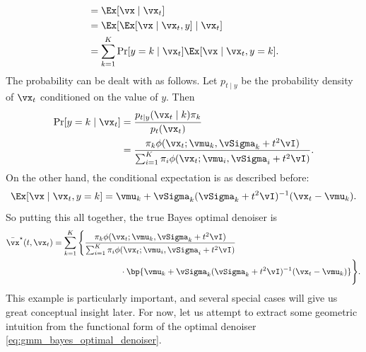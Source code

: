 \documentclass[../../book-main.tex]{subfiles}
\begin{document}
\begin{example}
\begin{align}
        &= \Ex[\vx \mid \vx_{t}] \\
        &= \Ex[\Ex[\vx \mid \vx_{t}, y] \mid \vx_{t}] \\
        &= \sum_{k = 1}^{K}\Pr[y = k \mid \vx_{t}]\Ex[\vx \mid \vx_{t}, y = k].
    \end{align}
    The probability can be dealt with as follows. Let \(p_{t \mid
    y}\) be the probability density of \(\vx_{t}\) conditioned on the
    value of \(y\). Then
    \begin{align}
        \Pr[y = k \mid \vx_{t}]
        &= \frac{p_{t \mid y}(\vx_{t} \mid k)\pi_{k}}{p_{t}(\vx_{t})} \\
        &= \frac{\pi_{k}\phi(\vx_{t} ; \vmu_{k}, \vSigma_{k}
        + t^{2}\vI)}{\sum_{i = 1}^{K}\pi_{i}\phi(\vx_{t} ; \vmu_{i},
        \vSigma_{i} + t^{2}\vI)}.
    \end{align}
    On the other hand, the conditional expectation is as described before:
    \begin{equation}
        \Ex[\vx \mid \vx_{t}, y = k] = \vmu_{k} +
        \vSigma_{k}(\vSigma_{k} + t^{2}\vI)^{-1}(\vx_{t} - \vmu_{k}).
    \end{equation}
    So putting this all together, the true Bayes optimal denoiser is
    \begin{align}\label{eq:gmm_bayes_optimal_denoiser}
        \bar{\vx}^{\star}(t, \vx_{t}) &= \sum_{k =
        1}^{K}\Bigg\{\frac{\pi_{k}\phi(\vx_{t}
            ;\vmu_{k}, \vSigma_{k} + t^{2}\vI)}{\sum_{i =
                1}^{K}\pi_{i}\phi(\vx_{t}
            ;\vmu_{i}, \vSigma_{i} + t^{2}\vI)}\\
            &\qquad \qquad \qquad \qquad   \cdot \bp{\vmu_{k} +
        \vSigma_{k}(\vSigma_{k} + t^{2}\vI)^{-1}(\vx_{t} - \vmu_{k})}\Bigg\}.
    \end{align}
    This example is particularly important, and several special cases
    will give us great conceptual insight later. For now, let us
    attempt to extract some geometric intuition from the functional
    form of the optimal denoiser \eqref{eq:gmm_bayes_optimal_denoiser}.


\end{example}
\end{document}

